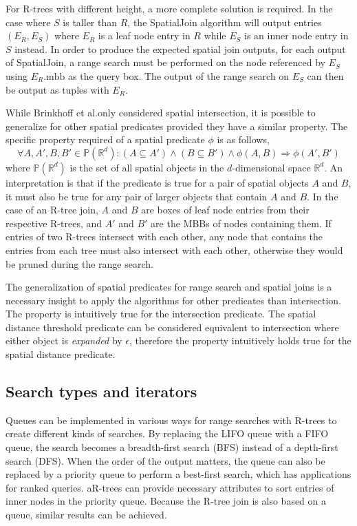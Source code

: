 For R-trees with different height, a more complete solution is required. In the case where \(S\) is taller than \(R\), the SpatialJoin algorithm will output entries \((E_R, E_S)\) where \(E_R\) is a leaf node entry in \(R\) while \(E_S\) is an inner node entry in \(S\) instead. In order to produce the expected spatial join outputs, for each output of SpatialJoin, a range search must be performed on the node referenced by \(E_S\) using \(E_R\mathrm{.mbb}\) as the query box. The output of the range search on \(E_S\) can then be output as tuples with \(E_R\).

While Brinkhoff et al.\@ only considered spatial intersection, it is possible to generalize for other spatial predicates provided they have a similar property. The specific property required of a spatial predicate \(\phi\) is as follows,
\[
  \forall A, A', B, B' \in \mathbb{P}(\mathbb{R}^d) : (A \subseteq A') \wedge (B \subseteq B') \wedge \phi(A, B) \Rightarrow \phi(A', B')
\]
where \(\mathbb{P}(\mathbb{R}^d)\) is the set of all spatial objects in the \(d\)-dimensional space \(\mathbb{R}^d\). An interpretation is that if the predicate is true for a pair of spatial objects \(A\) and \(B\), it must also be true for any pair of larger objects that contain \(A\) and \(B\). In the case of an R-tree join, \(A\) and \(B\) are boxes of leaf node entries from their respective R-trees, and \(A'\) and \(B'\) are the MBBs of nodes containing them. If entries of two R-trees intersect with each other, any node that contains the entries from each tree must also intersect with each other, otherwise they would be pruned during the range search.

The generalization of spatial predicates for range search and spatial joins is a necessary insight to apply the algorithms for other predicates than intersection. The property is intuitively true for the intersection predicate. The spatial distance threshold predicate can be considered equivalent to intersection where either object is \emph{expanded} by \(\epsilon\), therefore the property intuitively holds true for the spatial distance predicate.

\subsection{Search types and iterators}

Queues can be implemented in various ways for range searches with R-trees to create different kinds of searches. By replacing the LIFO queue with a FIFO queue, the search becomes a breadth-first search (BFS) instead of a depth-first search (DFS). When the order of the output matters, the queue can also be replaced by a priority queue to perform a best-first search, which has applications for ranked queries. aR-trees can provide necessary attributes to sort entries of inner nodes in the priority queue. Because the R-tree join is also based on a queue, similar results can be achieved.

